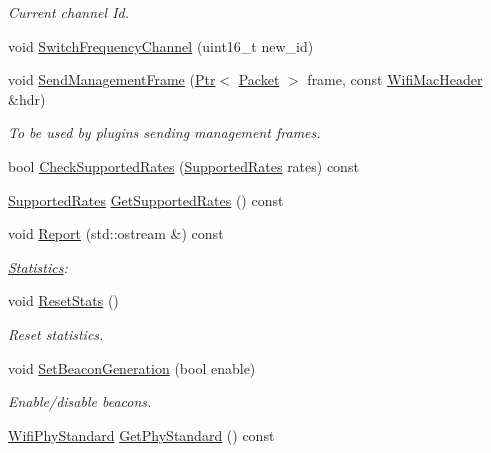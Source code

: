 \begin{DoxyCompactItemize}
\begin{DoxyCompactList}\small\item\em Current channel Id. \end{DoxyCompactList}\item 
void \hyperlink{classns3_1_1MeshWifiInterfaceMac_a2d850463970dd7f6d477dd0ecf615e2b}{Switch\+Frequency\+Channel} (uint16\+\_\+t new\+\_\+id)
\item 
void \hyperlink{classns3_1_1MeshWifiInterfaceMac_a585fd60331e22f8aee7854001b2fee3b}{Send\+Management\+Frame} (\hyperlink{classns3_1_1Ptr}{Ptr}$<$ \hyperlink{classns3_1_1Packet}{Packet} $>$ frame, const \hyperlink{classns3_1_1WifiMacHeader}{Wifi\+Mac\+Header} \&hdr)
\begin{DoxyCompactList}\small\item\em To be used by plugins sending management frames. \end{DoxyCompactList}\item 
bool \hyperlink{classns3_1_1MeshWifiInterfaceMac_a2e9bcc69159f4845819b3d99e70083c5}{Check\+Supported\+Rates} (\hyperlink{classns3_1_1SupportedRates}{Supported\+Rates} rates) const 
\item 
\hyperlink{classns3_1_1SupportedRates}{Supported\+Rates} \hyperlink{classns3_1_1MeshWifiInterfaceMac_a37557f1d320a7e81777212f4bad16839}{Get\+Supported\+Rates} () const 
\item 
void \hyperlink{classns3_1_1MeshWifiInterfaceMac_a8488cd744dee32b967930a80aefb9f73}{Report} (std\+::ostream \&) const 
\begin{DoxyCompactList}\small\item\em \hyperlink{structns3_1_1MeshWifiInterfaceMac_1_1Statistics}{Statistics}\+: \end{DoxyCompactList}\item 
void \hyperlink{classns3_1_1MeshWifiInterfaceMac_a4e8ad7165ce5778edb230f71bf9fae32}{Reset\+Stats} ()
\begin{DoxyCompactList}\small\item\em Reset statistics. \end{DoxyCompactList}\item 
void \hyperlink{classns3_1_1MeshWifiInterfaceMac_a850bda1e62a17dee6211e5423878c948}{Set\+Beacon\+Generation} (bool enable)
\begin{DoxyCompactList}\small\item\em Enable/disable beacons. \end{DoxyCompactList}\item 
\hyperlink{group__wifi_ga1299834f4e1c615af3ca738033b76a49}{Wifi\+Phy\+Standard} \hyperlink{classns3_1_1MeshWifiInterfaceMac_a3bb1eefefdad18c697a99d4184086513}{Get\+Phy\+Standard} () const 

\end{DoxyCompactItemize}
